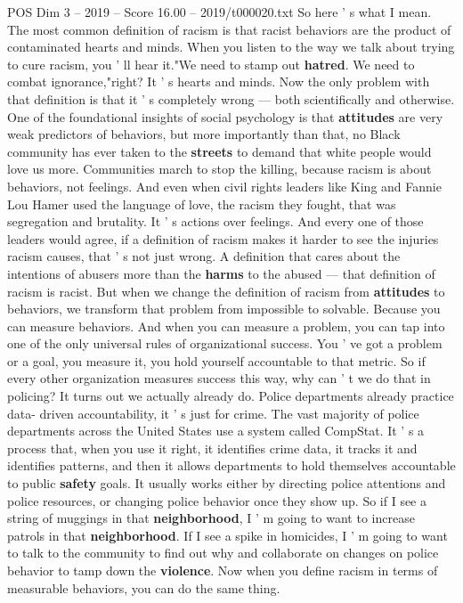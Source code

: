\begin{textsample}{POS Dim 3 – 2019 – Score 16.00 – 2019/t000020.txt}
So here ' s what I mean.
The most common definition of racism is that racist behaviors are the product of contaminated hearts and minds.
When you listen to the way we talk about trying to cure racism, you ' ll hear it."We need to stamp out \textbf{hatred}.
We need to combat ignorance,"right?
It ' s hearts and minds.
Now the only problem with that definition is that it ' s completely wrong — both scientifically and otherwise.
One of the foundational insights of social psychology is that \textbf{attitudes} are very weak predictors of behaviors, but more importantly than that, no Black community has ever taken to the \textbf{streets} to demand that white people would love us more.
Communities march to stop the killing, because racism is about behaviors, not feelings.
And even when civil rights leaders like King and Fannie Lou Hamer used the language of love, the racism they fought, that was segregation and brutality.
It ' s actions over feelings.
And every one of those leaders would agree, if a definition of racism makes it harder to see the injuries racism causes, that ' s not just wrong.
A definition that cares about the intentions of abusers more than the \textbf{harms} to the abused — that definition of racism is racist.
But when we change the definition of racism from \textbf{attitudes} to behaviors, we transform that problem from impossible to solvable.
Because you can measure behaviors.
And when you can measure a problem, you can tap into one of the only universal rules of organizational success.
You ' ve got a problem or a goal, you measure it, you hold yourself accountable to that metric.
So if every other organization measures success this way, why can ' t we do that in policing?
It turns out we actually already do.
Police departments already practice data- driven accountability, it ' s just for crime.
The vast majority of police departments across the United States use a system called CompStat.
It ' s a process that, when you use it right, it identifies crime data, it tracks it and identifies patterns, and then it allows departments to hold themselves accountable to public \textbf{safety} goals.
It usually works either by directing police attentions and police resources, or changing police behavior once they show up.
So if I see a string of muggings in that \textbf{neighborhood}, I ' m going to want to increase patrols in that \textbf{neighborhood}.
If I see a spike in homicides, I ' m going to want to talk to the community to find out why and collaborate on changes on police behavior to tamp down the \textbf{violence}.
Now when you define racism in terms of measurable behaviors, you can do the same thing.

\end{textsample}
